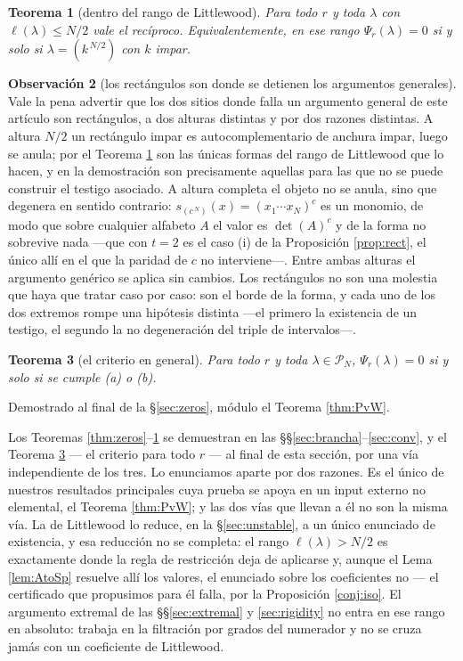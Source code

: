\documentclass[11pt,reqno]{amsart}
\theoremstyle{plain}
\newtheorem{theorem}{Teorema}[section]
\theoremstyle{definition}
\newtheorem{remark}[theorem]{Observación}
\newcommand{\PP}{\mathcal{P}}
\begin{document}
\begin{theorem}[dentro del rango de Littlewood]\label{thm:stable}
Para todo $r$ y toda $\lambda$ con $\ell(\lambda)\le N/2$ vale el recíproco. Equivalentemente, en ese
rango $\Psi_r(\lambda)=0$ si y solo si $\lambda=(k^{\,N/2})$ con $k$ impar.
\end{theorem}

\begin{remark}[los rectángulos son donde se detienen los argumentos generales]
Vale la pena advertir que los dos sitios donde falla un argumento general de este artículo son
rectángulos, a dos alturas distintas y por dos razones distintas. A altura $N/2$ un rectángulo impar
es autocomplementario de anchura impar, luego se anula; por el Teorema \ref{thm:stable} son las
únicas formas del rango de Littlewood que lo hacen, y en la demostración son precisamente aquellas
para las que no se puede construir el testigo asociado. A altura completa el objeto no se anula, sino
que degenera en sentido contrario: $s_{(c^{\,N})}(x)=(x_1\cdots x_N)^{c}$ es un monomio, de modo que
sobre cualquier alfabeto $A$ el valor es $\det(A)^{c}$ y de la forma no sobrevive nada ---que con
$t=2$ es el caso {\rm(i)} de la Proposición \ref{prop:rect}, el único allí en el que la paridad de
$c$ no interviene---. Entre ambas alturas el argumento genérico se aplica sin cambios. Los
rectángulos no son una molestia que haya que tratar caso por caso: son el borde de la forma, y cada
uno de los dos extremos rompe una hipótesis distinta ---el primero la existencia de un testigo, el
segundo la no degeneración del triple de intervalos---.
\end{remark}

\begin{theorem}[el criterio en general]\label{conj:crit}
Para todo $r$ y toda $\lambda\in\PP_N$, $\Psi_r(\lambda)=0$ si y solo si se cumple {\rm(a)} o
{\rm(b)}.
\end{theorem}

\noindent Demostrado al final de la \S\ref{sec:zeros}, módulo el Teorema \ref{thm:PvW}.

Los Teoremas \ref{thm:zeros}--\ref{thm:stable} se demuestran en las
\S\S\ref{sec:brancha}--\ref{sec:conv}, y el Teorema \ref{conj:crit} --- el criterio para todo
$r$ --- al final de esta sección, por una vía independiente de los tres. Lo enunciamos aparte por dos
razones. Es el único de nuestros resultados principales cuya prueba se apoya en
un input externo no elemental, el Teorema \ref{thm:PvW}; y las dos vías que llevan a él no son la
misma vía. La de Littlewood lo reduce, en la
\S\ref{sec:unstable}, a un único enunciado de existencia, y esa reducción no se completa: el rango
$\ell(\lambda)>N/2$ es exactamente donde la regla de restricción deja de aplicarse y, aunque el
Lema \ref{lem:AtoSp} resuelve allí los valores, el enunciado sobre los coeficientes no --- el
certificado que propusimos para él falla, por la Proposición \ref{conj:iso}. El argumento extremal
de las \S\S\ref{sec:extremal} y \ref{sec:rigidity} no entra en ese rango en absoluto: trabaja en
la filtración por grados del numerador y no se cruza jamás con un coeficiente de Littlewood.
\end{document}
